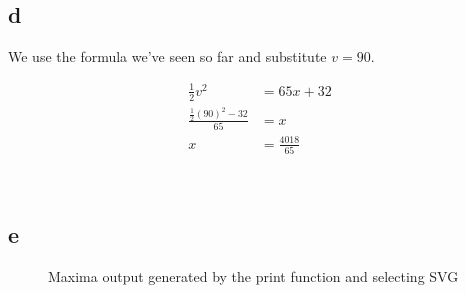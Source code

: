\documentclass{article}
\newcommand{\blankpage}{
    \newpage
    \
    \newpage
}
\begin{document}
\blankpage
\subsection{d}

We use the formula we've seen so far and substitute $v=90$.

\begin{align*}
    \frac12v^2 &= 65x + 32 \\
    \frac{\frac12(90)^2 - 32}{65} &= x \\
    x &= \frac{4018}{65}
\end{align*}

\blankpage
\subsection{e}

\begin{figure}[H]
    \centering
    \label{fig:maximaouttwo}
    \caption{Maxima output generated by the print function and selecting SVG}
\end{figure}

\blankpage


\end{document}
